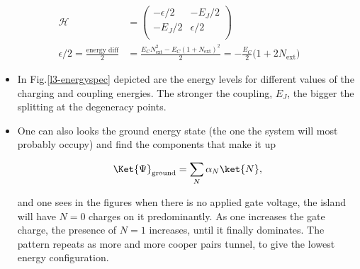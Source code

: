    \begin{equation}
	   \begin{aligned}
		   \mathcal{H} & = \begin{pmatrix}
		   -\epsilon/2 & -E_J/2\\
		   -E_J/2 & \epsilon/2\\
		   \end{pmatrix}\\
		   \epsilon/2 = \frac{\text{energy diff}}{2} & = \frac{E_CN_\text{ext}^2-E_C(1+N_\text{ext})^2}{2} = -\frac{E_C}{2}\big(1+2N_\text{ext}\big)
	   \end{aligned}
   \end{equation}

   \noindent {}
   
  \begin{itemize}
  	\item In Fig.\ref{l3-energyspec} depicted are the energy levels for different values of the charging and coupling energies. The stronger the coupling, $ E_J $, the bigger the splitting at the degeneracy points.
  	
  	
   
  \item One can also looks the ground energy state (the one the system will most probably occupy) and find the components that make it up
  
  \[
  	\Ket{\Psi}_{\text{ground}} = \sum_N\alpha_N\ket{N},
  \]
  
  \noindent and one sees in the figures when there is no applied gate voltage, the island will have $ N=0 $ charges on it predominantly. As one increases the gate charge, the presence of $ N=1 $ increases, until it finally dominates. The pattern repeats as more and more cooper pairs tunnel, to give the lowest energy configuration.
  
  
\end{itemize}

